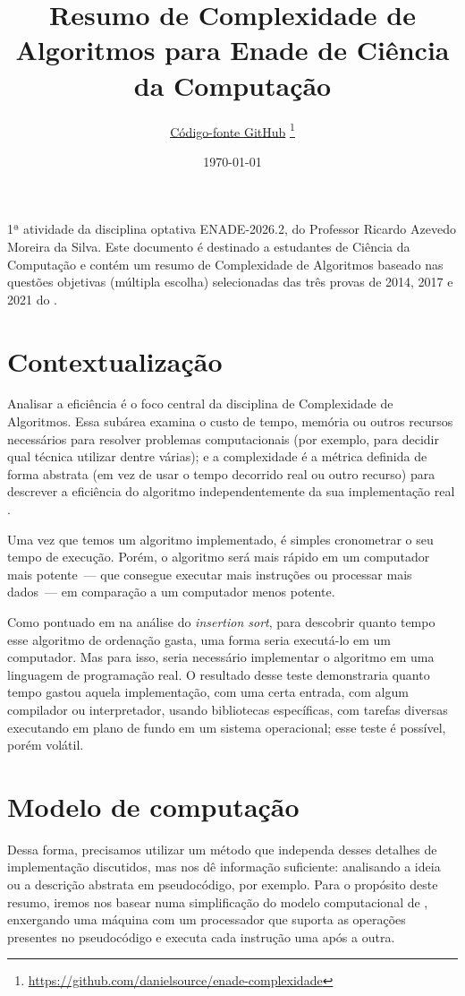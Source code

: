\documentclass[12pt,a4paper]{article}
\title{Resumo de Complexidade de Algoritmos para Enade de Ciência da Computação}
\author{
    \small\href{https://github.com/danielsource/enade-complexidade}{Código-fonte GitHub}%
    \thanks{\url{https://github.com/danielsource/enade-complexidade}}
}
\date{\today}
\begin{document}
\maketitle
1ª atividade da disciplina optativa ENADE-2026.2, do Professor Ricardo Azevedo Moreira da Silva.
Este documento é destinado a estudantes de Ciência da Computação
e contém um resumo de Complexidade de Algoritmos baseado nas questões objetivas (múltipla escolha)
selecionadas das três provas de 2014, 2017 e 2021 do .

\section{Contextualização}
Analisar a eficiência é o foco central da disciplina de Complexidade de Algoritmos.
Essa subárea examina o custo de tempo, memória ou outros recursos necessários para resolver problemas computacionais
(por exemplo, para decidir qual técnica utilizar dentre várias);
e a complexidade é a métrica definida de forma abstrata (em vez de usar o tempo decorrido real ou outro recurso)
para descrever a eficiência do algoritmo independentemente da sua implementação real \parencite[275--276]{sipser2012}.

Uma vez que temos um algoritmo implementado, é simples cronometrar o seu tempo de execução.
Porém, o algoritmo será mais rápido em um computador mais potente~---
que consegue executar mais instruções ou processar mais dados~---
em comparação a um computador menos potente.

Como pontuado em \textcite[27--28]{clrs2022} na análise do \textit{insertion sort},
para descobrir quanto tempo esse algoritmo de ordenação gasta, uma forma seria executá-lo em um computador.
Mas para isso, seria necessário implementar o algoritmo em uma linguagem de programação real.
O resultado desse teste demonstraria quanto tempo gastou aquela implementação, com uma certa entrada,
com algum compilador ou interpretador, usando bibliotecas específicas,
com tarefas diversas executando em plano de fundo em um sistema operacional;
esse teste é possível, porém volátil.

\section{Modelo de computação}\label{sec:modelo}
Dessa forma, precisamos utilizar um método que independa desses detalhes de implementação discutidos, mas nos dê informação suficiente:
analisando a ideia ou a descrição abstrata em pseudocódigo, por exemplo.
Para o propósito deste resumo, iremos nos basear numa simplificação do modelo computacional de \textcite[26]{clrs2022},
enxergando uma máquina com um processador que suporta as operações presentes no pseudocódigo e
executa cada instrução uma após a outra.
\end{document}
